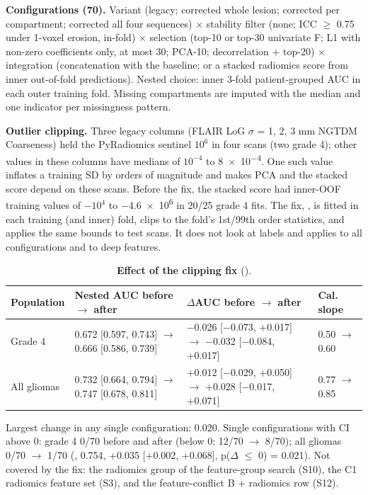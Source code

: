 \documentclass[11pt,a4paper]{article}
\begin{document}
\textbf{Configurations (70).} Variant (legacy; corrected whole lesion; corrected per compartment; corrected
all four sequences) $\times$ stability filter (none; ICC $\geq$ 0.75 under 1-voxel erosion, in-fold) $\times$
selection (top-10 or top-30 univariate F; L1 with non-zero coefficients only, at most 30; PCA-10;
decorrelation + top-20) $\times$ integration (concatenation with the baseline; or a stacked radiomics score
from inner out-of-fold predictions). Nested choice: inner 3-fold patient-grouped AUC in each outer training
fold. Missing compartments are imputed with the median and one indicator per missingness pattern.

\textbf{Outlier clipping.} Three legacy columns (FLAIR LoG $\sigma$ = 1, 2, 3 mm NGTDM Coarseness) held the
PyRadiomics sentinel $10^{6}$ in four scans (two grade 4); other values in these columns have medians of
$10^{-4}$ to \num{8e-4}. One such value inflates a training SD by orders of magnitude and makes PCA and the
stacked score depend on these scans. Before the fix, the stacked score had inner-OOF training values of
$-10^{4}$ to $-$\num{4.6e6} in 20/25 grade 4 fits. The fix, , is fitted in each
training (and inner) fold, clips to the fold's 1st/99th order statistics, and applies the same bounds to test
scans. It does not look at labels and applies to all configurations and to deep features.

\begin{table}[H]
\centering
\footnotesize
\renewcommand{\thetable}{S8}\renewcommand{\theHtable}{S8}
\caption{\textbf{Effect of the clipping fix} ().}
\label{tab:S8}
\begin{tabularx}{\linewidth}{@{}R{1.9cm} L L R{1.7cm}@{}}
\toprule
Population & Nested AUC before $\rightarrow$ after & $\Delta$AUC before $\rightarrow$ after & Cal. slope \\
\midrule
Grade 4 & 0.672 [0.597, 0.743] $\rightarrow$ 0.666 [0.586, 0.739] & $-$0.026 [$-$0.073, +0.017] $\rightarrow$ $-$0.032 [$-$0.084, +0.017] & 0.50 $\rightarrow$ 0.60 \\
All gliomas & 0.732 [0.664, 0.794] $\rightarrow$ 0.747 [0.678, 0.811] & +0.012 [$-$0.029, +0.050] $\rightarrow$ +0.028 [$-$0.017, +0.071] & 0.77 $\rightarrow$ 0.85 \\
\bottomrule
\end{tabularx}
\end{table}

Largest change in any single configuration: 0.020. Single configurations with CI above 0: grade 4 0/70 before
and after (below 0: 12/70 $\rightarrow$ 8/70); all gliomas 0/70 $\rightarrow$ 1/70
(, 0.754, +0.035 [+0.002, +0.068], p($\Delta$ $\leq$ 0) = 0.021). Not
covered by the fix: the radiomics group of the feature-group search (S10), the C1 radiomics feature set (S3),
and the feature-conflict B + radiomics row (S12).
\end{document}
